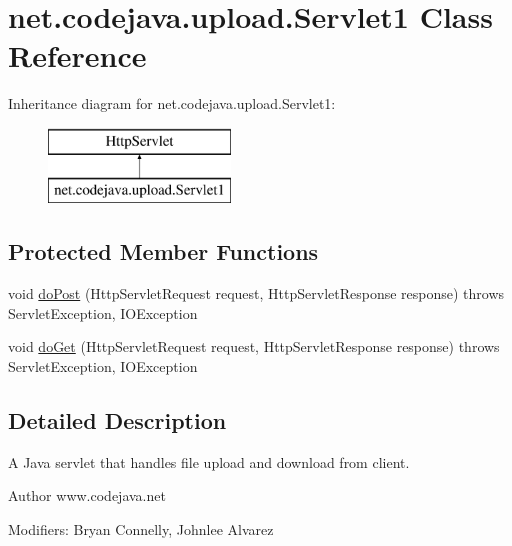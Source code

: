 \hypertarget{classnet_1_1codejava_1_1upload_1_1_servlet1}{\section{net.\+codejava.\+upload.\+Servlet1 Class Reference}
\label{classnet_1_1codejava_1_1upload_1_1_servlet1}
}
Inheritance diagram for net.\+codejava.\+upload.\+Servlet1\+:\begin{figure}[H]
\begin{center}
\leavevmode
\includegraphics[height=2.000000cm]{classnet_1_1codejava_1_1upload_1_1_servlet1}
\end{center}
\end{figure}
\subsection*{Protected Member Functions}
\begin{DoxyCompactItemize}
\item 
void \hyperlink{classnet_1_1codejava_1_1upload_1_1_servlet1_ac163d46545f634472456bd749b91a7c9}{do\+Post} (Http\+Servlet\+Request request, Http\+Servlet\+Response response)  throws Servlet\+Exception, I\+O\+Exception 
\item 
void \hyperlink{classnet_1_1codejava_1_1upload_1_1_servlet1_ab38ac3551f31e1b69eabfae8cdb885f8}{do\+Get} (Http\+Servlet\+Request request, Http\+Servlet\+Response response)  throws Servlet\+Exception, I\+O\+Exception 
\end{DoxyCompactItemize}


\subsection{Detailed Description}
A Java servlet that handles file upload and download from client. \begin{DoxyAuthor}{Author}
www.\+codejava.\+net 

 Modifiers\+: Bryan Connelly, Johnlee Alvarez 

 
\end{DoxyAuthor}



